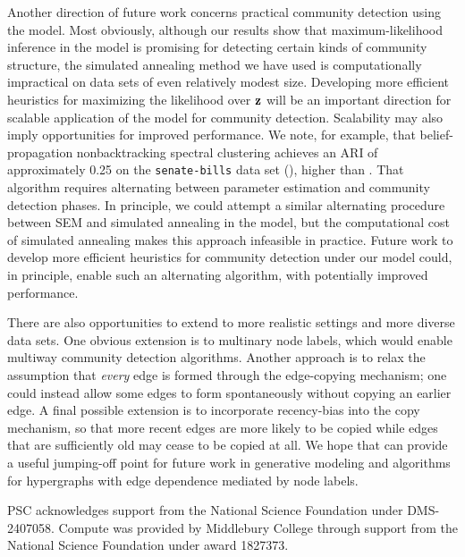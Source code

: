 \documentclass[aps,pre,reprint,superscriptaddress,nofootinbib]{revtex4-2}
\begin{document}
    Another direction of future work concerns practical community detection using the \model{} model.
    Most obviously, although our results show that maximum-likelihood inference in the \model{} model is promising for detecting certain kinds of community structure, the simulated annealing method we have used is computationally impractical on data sets of even relatively modest size. 
    Developing more efficient heuristics for maximizing the likelihood over $\mathbf{z}$ will be an important direction for scalable application of the \model{} model for community detection. 
    Scalability may also imply opportunities for improved performance.
    We note, for example,  that belief-propagation nonbacktracking spectral clustering \cite{chodrowNonbacktrackingSpectralClustering2023} achieves an ARI of approximately 0.25 on the \texttt{senate-bills} data set (), higher than \model{}. 
    That algorithm requires alternating between parameter estimation and community detection phases. 
    In principle, we could attempt a similar alternating procedure between SEM and simulated annealing in the \model{} model, but the computational cost of simulated annealing makes this approach infeasible in practice.
    Future work to develop more efficient heuristics for community detection under our model could, in principle, enable such an alternating algorithm, with potentially improved performance. 

    There are also opportunities to extend \model{} to more realistic settings and more diverse data sets. 
    One obvious extension is to multinary node labels, which would enable multiway community detection algorithms. 
    Another approach is to relax the assumption that \emph{every} edge is formed through the edge-copying mechanism; one could instead allow some edges to form spontaneously without copying an earlier edge. 
    A final possible extension is to incorporate recency-bias \cite{bensonSequencesSets2018} into the copy mechanism, so that more recent edges are more likely to be copied while edges that are sufficiently old may cease to be copied at all. 
    We hope that \model{} can provide a useful jumping-off point for future work in generative modeling and algorithms for hypergraphs with edge dependence mediated by node labels.

\begin{acknowledgments}
    PSC acknowledges support from the National Science Foundation under DMS-2407058.
    Compute was provided by Middlebury College through support from the National Science Foundation under award 1827373. 
\end{acknowledgments}
\end{document}
